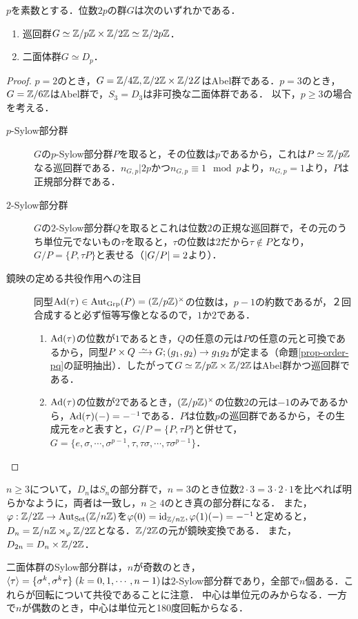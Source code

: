 \documentclass[uplatex,dvipdfmx]{jsreport}
\begin{document}
\begin{proposition}\label{prop-group-of-order-2p}
    $p$を素数とする．位数$2p$の群$G$は次のいずれかである．
    \begin{enumerate}
        \item 巡回群$G\simeq\mathbb{Z}/p\mathbb{Z}\times\mathbb{Z}/2\mathbb{Z}\simeq\mathbb{Z}/2p\mathbb{Z}$．
        \item 二面体群$G\simeq D_p$．
    \end{enumerate}
\end{proposition}
\begin{proof}
    $p=2$のとき，$G=\mathbb{Z}/4\mathbb{Z},\mathbb{Z}/2\mathbb{Z}\times\mathbb{Z}/2Z$はAbel群である．$p=3$のとき，$G=\mathbb{Z}/6\mathbb{Z}$はAbel群で，$S_3=D_3$は非可換な二面体群である．
    以下，$p\ge 3$の場合を考える．
    \begin{description}
        \item[$p$-Sylow部分群] $G$の$p$-Sylow部分群$P$を取ると，その位数は$p$であるから，これは$P\simeq\mathbb{Z}/p\mathbb{Z}$なる巡回群である．$n_{G,p}|2p$かつ$n_{G,p}\equiv 1\mod p$より，$n_{G,p}=1$より，$P$は正規部分群である．
        \item[$2$-Sylow部分群] $G$の$2$-Sylow部分群$Q$を取るとこれは位数$2$の正規な巡回群で，その元のうち単位元でないもの$\tau$を取ると，$\tau$の位数は$2$だから$\tau\notin P$となり，$G/P=\{P,\tau P\}$と表せる（$\lvert G/P\rvert=2$より）．
        \item[鏡映の定める共役作用への注目] 同型$\mathrm{Ad}(\tau)\in\mathrm{Aut}_{\mathrm{Grp}}(P)=(\mathbb{Z}/p\mathbb{Z})^\times$の位数は，$p-1$の約数であるが，２回合成すると必ず恒等写像となるので，$1$か$2$である．
        \begin{enumerate}
            \item $\mathrm{Ad}(\tau)$の位数が$1$であるとき，$Q$の任意の元は$P$の任意の元と可換であるから，同型$P\times Q\iso G;(g_1,g_2)\to g_1g_2$が定まる（命題\ref{prop-order-pq}の証明抽出）．したがって$G\simeq\mathbb{Z}/p\mathbb{Z}\times\mathbb{Z}/2\mathbb{Z}$はAbel群かつ巡回群である．
            \item $\mathrm{Ad}(\tau)$の位数が$2$であるとき，$(\mathbb{Z}/p\mathbb{Z})^\times$の位数$2$の元は$-1$のみであるから，$\mathrm{Ad}(\tau)(-)=-^{-1}$である．$P$は位数$p$の巡回群であるから，その生成元を$\sigma$と表すと，$G/P=\{P,\tau P\}$と併せて，$G=\{e,\sigma,\cdots,\sigma^{p-1},\tau,\tau\sigma,\cdots,\tau\sigma^{p-1}\}$．
        \end{enumerate}
    \end{description}
\end{proof}
\begin{remark}[二面体群]\label{remark-Dn}
    $n\ge 3$について，$D_n$は$S_n$の部分群で，$n=3$のとき位数$2\cdot 3=3\cdot 2\cdot 1$を比べれば明らかなように，両者は一致し，$n\ge 4$のとき真の部分群になる．
    また，$\varphi:\mathbb{Z}/2\mathbb{Z}\to\mathrm{Aut}_{\mathrm{Set}}(\mathbb{Z}/n\mathbb{Z})$を$\varphi(0)=\mathrm{id}_{\mathbb{Z}/n\mathbb{Z}},\varphi(1)(-)={-}^{-1}$と定めると，$D_n=\mathbb{Z}/n\mathbb{Z}\rtimes_\varphi\mathbb{Z}/2\mathbb{Z}$となる．$\mathbb{Z}/2\mathbb{Z}$の元が鏡映変換である．
    また，$D_{2n}=D_n\times\mathbb{Z}/2\mathbb{Z}$．

    二面体群のSylow部分群は，$n$が奇数のとき，$\langle\tau\rangle=\{\sigma^k,\sigma^k\tau\}\;(k=0,1,\cdots,n-1)$は$2$-Sylow部分群であり，全部で$n$個ある．これらが回転について共役であることに注意．
    中心は単位元のみからなる．一方で$n$が偶数のとき，中心は単位元と180度回転からなる．
\end{remark}
\end{document}
